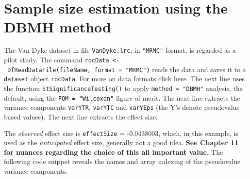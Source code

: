 \documentclass[]{book}
\newenvironment{Shaded}{\begin{snugshade}}{\end{snugshade}}
\newcommand{\CommentTok}[1]{\textcolor[rgb]{0.56,0.35,0.01}{\textit{#1}}}
\newcommand{\DataTypeTok}[1]{\textcolor[rgb]{0.13,0.29,0.53}{#1}}
\newcommand{\FloatTok}[1]{\textcolor[rgb]{0.00,0.00,0.81}{#1}}
\newcommand{\KeywordTok}[1]{\textcolor[rgb]{0.13,0.29,0.53}{\textbf{#1}}}
\newcommand{\NormalTok}[1]{#1}
\newcommand{\OperatorTok}[1]{\textcolor[rgb]{0.81,0.36,0.00}{\textbf{#1}}}
\newcommand{\StringTok}[1]{\textcolor[rgb]{0.31,0.60,0.02}{#1}}
\begin{document}
\hypertarget{sample-size-estimation-using-the-dbmh-method}{%
\section{Sample size estimation using the DBMH method}\label{sample-size-estimation-using-the-dbmh-method}}

The Van Dyke dataset in file \texttt{VanDyke.lrc}, in \texttt{"MRMC"} format, is regarded as a pilot study. The command \texttt{rocData\ \textless{}-\ DfReadDataFile(fileName,\ format\ =\ "MRMC")} reads the data and saves it to a \texttt{dataset} object \texttt{rocData}. \href{https://dpc10ster.github.io/RJafroc/reference/RJafroc-package.html}{For more on data formats click here}. The next line uses the function \texttt{StSignificanceTesting()} to apply \texttt{method\ =\ "DBMH"} analysis, the default, using the \texttt{FOM\ =\ "Wilcoxon"} figure of merit. The next line extracts the variance components \texttt{varYTR}, \texttt{varYTC} and \texttt{varYEps} (the Y's denote pseudovalue based values). The next line extracts the effect size.

\begin{Shaded}
\end{Shaded}

The \emph{observed} effect size is \texttt{effectSize} = -0.0438003, which, in this example, is used as the \emph{anticipated} effect size, generally not a good idea. \textbf{See Chapter 11 for nuances regarding the choice of this all important value.} The following code snippet reveals the names and array indexing of the pseudovalue variance components.
\end{document}
